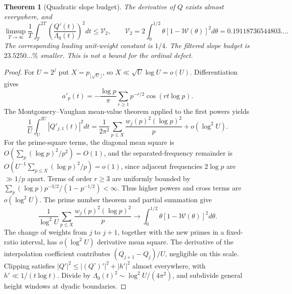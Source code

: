 \documentclass[11pt,reqno]{amsart}
\makeatletter
\let\CG@origcite\cite
\renewcommand*{\cite}[2][]{\def\CG@citekey{#2}%
  \ifx\relax#1\relax\CG@origcite{#2}\else\CG@origcite[#1]{#2}\fi}
\numberwithin{equation}{section}
\newtheorem{theorem}{Theorem}[section]
\theoremstyle{definition}
\theoremstyle{remark}
\makeatother
\begin{document}
\begin{theorem}[Quadratic slope budget]\label{thm:tauC2_slope_v8}
The derivative of $Q$ exists almost everywhere, and
\begin{equation}
 \limsup_{T\to\infty}\frac1T\int_T^{2T}
 \left(\frac{Q'(t)}{\Lambda_0(t)}\right)^2dt
 \le\mathcal V_2,\qquad
 \mathcal V_2=2\int_0^{1/2}\theta
 [1-\mathscr W(\theta)]^2d\theta
 =0.19118736544803\ldots .
 \label{eq:tauC2_slope_v8}
\end{equation}
The corresponding leading unit-weight constant is $1/4$.
The filtered slope budget is $23.5250\ldots\%$ smaller.
This is not a bound for the ordinal defect.
\end{theorem}
\begin{proof}
For $U=2^j$ put $X=p_{\lfloor\sqrt U\rfloor}$,
so $X\ll\sqrt U\log U=o(U)$. Differentiation gives
\[
 a'_p(t)=-\frac{\log p}{\pi}\sum_{r\ge1}
 p^{-r/2}\cos(rt\log p).
\]
The Montgomery--Vaughan mean-value theorem
\cite{MontgomeryVaughan1974} applied to the first powers yields
\[
 \frac1U\int_U^{2U}|Q'_{j,1}(t)|^2dt
 =\frac1{2\pi^2}\sum_{p\le X}
 \frac{w_j(p)^2(\log p)^2}{p}+o(\log^2 U).
\]
For the prime-square terms, the diagonal mean square is
$O(\sum_p(\log p)^2/p^2)=O(1)$, and the
separated-frequency remainder is
$O(U^{-1}\sum_{p\le X}(\log p)^2/p)=o(1)$,
since adjacent frequencies $2\log p$ are $\gg1/p$ apart.
Terms of order $r\ge3$ are uniformly bounded by
$\sum_p(\log p)p^{-3/2}/(1-p^{-1/2})<\infty$.
Thus higher powers and cross terms are $o(\log^2U)$.
The prime number theorem and partial summation give
\[
 \frac1{\log^2U}\sum_{p\le X}
 \frac{w_j(p)^2(\log p)^2}{p}
 \longrightarrow
 \int_0^{1/2}\theta[1-\mathscr W(\theta)]^2d\theta.
\]
The change of weights from $j$ to $j+1$, together with the
new primes in a fixed-ratio interval, has
$o(\log^2 U)$ derivative mean square. The derivative of
the interpolation coefficient contributes
$(Q_{j+1}-Q_j)/U$, negligible on this scale.
Clipping satisfies $|Q'|^2\le|(Q^\circ)'|^2+|h'|^2$
almost everywhere, with $h'\ll1/(t\log t)$.
Divide by $\Lambda_0(t)^2\sim\log^2U/(4\pi^2)$,
and subdivide general height windows at dyadic boundaries.
\end{proof}
\end{document}
